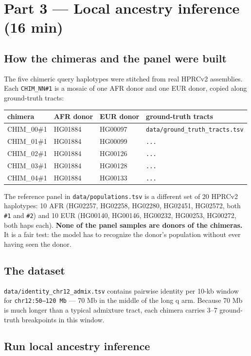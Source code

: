 \documentclass[11pt]{article}
\begin{document}
\section{Part 3 --- Local ancestry inference (16 min)}

\subsection*{How the chimeras and the panel were built}

The five chimeric query haplotypes were stitched from real HPRCv2
assemblies. Each \texttt{CHIM\_NN\#1} is a mosaic of one AFR donor and
one EUR donor, copied along ground-truth tracts:

\medskip
\begin{tabular}{@{}llll@{}}
\toprule
chimera & AFR donor & EUR donor & ground-truth tracts \\
\midrule
CHIM\_00\#1 & HG01884 & HG00097 & \texttt{data/ground\_truth\_tracts.tsv} \\
CHIM\_01\#1 & HG01884 & HG00099 & \texttt{...} \\
CHIM\_02\#1 & HG01884 & HG00126 & \texttt{...} \\
CHIM\_03\#1 & HG01884 & HG00128 & \texttt{...} \\
CHIM\_04\#1 & HG01884 & HG00133 & \texttt{...} \\
\bottomrule
\end{tabular}

\medskip

The reference panel in \texttt{data/populations.tsv} is a different
set of 20 HPRCv2 haplotypes: 10 AFR (HG02257, HG02258, HG02280,
HG02451, HG02572, both \texttt{\#1} and \texttt{\#2}) and 10 EUR
(HG00140, HG00146, HG00232, HG00253, HG00272, both haps each).
\textbf{None of the panel samples are donors of the chimeras.} It is
a fair test: the model has to recognize the donor's population
without ever having seen the donor.

\subsection*{The dataset}

\texttt{data/identity\_chr12\_admix.tsv} contains pairwise identity
per 10-kb window for \texttt{chr12:50--120\,Mb} --- 70 Mb in the
middle of the long q arm. Because 70 Mb is much longer than a
typical admixture tract, each chimera carries 3--7 ground-truth
breakpoints in this window.

\subsection*{Run local ancestry inference}
\end{document}
